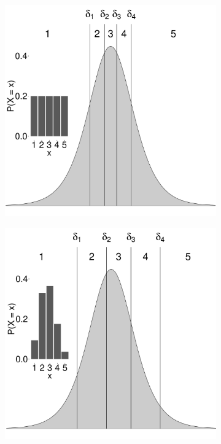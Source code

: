 \documentclass{article}
\begin{document}
\begin{figure}
	\centering
	\begin{subfigure}{.5\textwidth}
		\centering
		\includegraphics[width=\linewidth]{figures/orderedLogisticUnbiased.pdf}
	\end{subfigure}%
	\begin{subfigure}{.5\textwidth}
		\centering
		\includegraphics[width=\linewidth]{figures/orderedLogisticBiased.pdf}

\end{subfigure}
\end{figure}
\end{document}
